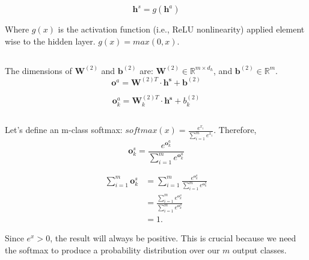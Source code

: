 \documentclass[reqno]{amsart}
\theoremstyle{definition}
\theoremstyle{remark}
\numberwithin{equation}{section}
\begin{document}
\begin{equation}
    \mathbf{h}^s = g(\mathbf{h}^a)
\end{equation}

Where $g(x)$ is the activation function (i.e., ReLU nonlinearity) applied element wise to the hidden layer. $g(x) = max(0,x)$.

\subsection{}
The dimensions of $\mathbf{W}^{(2)}$ and $\mathbf{b}^{(2)}$ are:
$\mathbf{W}^{(2)} \in \mathbb{R}^{m \times d_h}$, and $\mathbf{b}^{(2)} \in \mathbb{R}^{m}$. \\

\begin{equation}
    \mathbf{o}^a = \mathbf{W}^{(2)T} \cdot \mathbf{h^s}+ \mathbf{b}^{(2)}
\end{equation}

\begin{equation}
    \mathbf{o}_k^a = \mathbf{W}_k^{(2)T} \cdot \mathbf{h^s}+ b_k^{(2)}
\end{equation}

\subsection{}

Let's define an m-class softmax: $softmax(x) = \frac{e^{x_i}}{\sum_{i=1}^m e^{x_i}}$. Therefore, \\

\begin{equation}
    \mathbf{o}_k^s = \frac{e^{\mathbf{o}_k^a}}{\sum_{i=1}^m e^{\mathbf{o}_k^a}}
\end{equation}

\begin{align}
\sum_{i=1}^m \mathbf{o}_k^s 
&= \sum_{i=1}^m \frac{e^{\mathbf{o}_k^a}}{\sum_{i=1}^m e^{\mathbf{o}_k^a}} \\
&= \frac{\sum_{i=1}^m e^{\mathbf{o}_k^a}}{\sum_{i=1}^m e^{\mathbf{o}_k^a}} \\
&= 1.
\end{align}

Since $e^x > 0$, the result will always be positive. This is crucial because we need the softmax to produce a probability  distribution over our $m$ output classes.

\subsection{}
\end{document}
